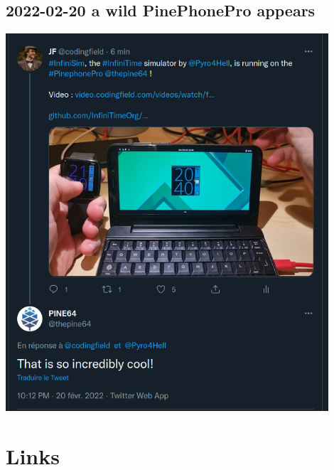 \documentclass{beamer}
\begin{document}
\subsection{2022-02-20 a wild PinePhonePro appears}
\begin{frame}{}

  \centering\includegraphics[width=0.9\textwidth]{../2022-02-20_InfiniSim_on_PinePhonePro}

\end{frame}

\section{Links}
\end{document}
